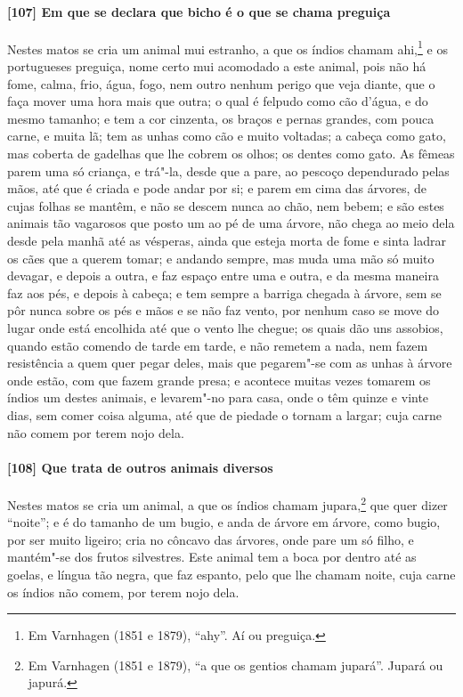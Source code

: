 \paragraph{[107] Em que se declara que bicho é o que se chama preguiça}\quad
Nestes matos se cria um animal mui estranho, a que os índios chamam ahi,\footnote{ Em
Varnhagen (1851 e 1879), ``ahy''. Aí ou preguiça.} e os portugueses preguiça, nome certo
mui acomodado a este animal, pois não há fome, calma, frio, água, fogo, nem outro nenhum
perigo que veja diante, que o faça mover uma hora mais que outra; o qual é felpudo como
cão d'água, e do mesmo tamanho; e tem a cor cinzenta, os braços e pernas grandes, com
pouca carne, e muita lã; tem as unhas como cão e muito voltadas; a cabeça como gato, mas
coberta de gadelhas que lhe cobrem os olhos; os dentes como gato. As fêmeas parem uma só
criança, e trá"-la, desde que a pare, ao pescoço dependurado pelas mãos, até que é criada e
pode andar por si; e parem em cima das árvores, de cujas folhas se mantêm, e não se descem
nunca ao chão, nem bebem; e são estes animais tão vagarosos que posto um ao pé de uma
árvore, não chega ao meio dela desde pela manhã até as vésperas, ainda que esteja morta de
fome e sinta ladrar os cães que a querem tomar; e andando sempre, mas muda uma mão só
muito devagar, e depois a outra, e faz espaço entre uma e outra, e da mesma maneira faz
aos pés, e depois à cabeça; e tem sempre a barriga chegada à árvore, sem se pôr nunca
sobre os pés e mãos e se não faz vento, por nenhum caso se move do lugar onde está
encolhida até que o vento lhe chegue; os quais dão uns assobios, quando estão comendo de
tarde em tarde, e não remetem a nada, nem fazem resistência a quem quer pegar deles, mais
que pegarem"-se com as unhas à árvore onde estão, com que fazem grande presa; e acontece
muitas vezes tomarem os índios um destes animais, e levarem"-no para casa, onde o têm
quinze e vinte dias, sem comer coisa alguma, até que de piedade o tornam a largar; cuja
carne não comem por terem nojo dela.

\paragraph{[108] Que trata de outros animais diversos}\quad
Nestes matos se cria um animal, a que os índios chamam jupara,\footnote{ Em Varnhagen
(1851 e 1879), ``a que os gentios chamam jupará''. Jupará ou japurá.} que quer dizer
``noite''; e é do tamanho de um bugio, e anda de árvore em árvore, como bugio, por ser
muito ligeiro; cria no côncavo das árvores, onde pare um só filho, e mantém"-se dos frutos
silvestres. Este animal tem a boca por dentro até as goelas, e língua tão negra, que faz
espanto, pelo que lhe chamam noite, cuja carne os índios não comem, por terem nojo dela.

